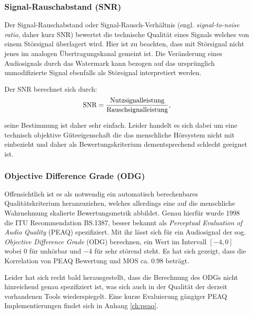 \subsubsection{Signal-Rauschabstand (SNR)} 

Der Signal-Rauschabstand oder Signal-Rausch-Verhältnis (engl. \textit{signal-to-noise ratio}, daher kurz SNR) bewertet die technische Qualität eines Signals welches von einem Störsignal überlagert wird. Hier ist zu beachten, dass mit Störsignal nicht jenes im analogen Übertragungskanal gemeint ist. Die Veränderung eines Audiosignals durch das Watermark kann bezogen auf das ursprünglich unmodifizierte Signal ebenfalls als Störsignal interpretiert werden. 

Der SNR berechnet sich durch: 
	\begin{equation}	
		\mbox{SNR} = {\mbox{Nutzsignalleistung} \over \mbox{Rauschsignalleistung}},
		\label{equ:snr}
	\end{equation}

seine Bestimmung ist daher sehr einfach. Leider handelt es sich dabei um eine technisch objektive Güteeigenschaft die das menschliche Hörsystem nicht mit einbezieht und daher als Bewertungskriterium dementsprechend schlecht geeignet ist\cite{xiang2007robust}.

\subsubsection{Objective Difference Grade (ODG)} 

Offensichtlich ist es als notwendig ein automatisch berechenbares Qualitätskriterium heranzuziehen, welches allerdings eine auf die menschliche Wahrnehmung skalierte Bewertungsmetrik abbildet. Genau hierfür wurde 1998 die ITU Recommendation BS.1387\cite{rec1998bs}, besser bekannt als \textit{Perceptual Evaluation of Audio Quality} (PEAQ) spezifiziert. Mit ihr lässt sich für ein Audiosignal der sog. \textit{Objective Difference Grade} (ODG) berechnen, ein Wert im Intervall $[-4,0]$ wobei $0$ für  \glqq{}unhörbar\grqq{} und $-4$ für \glqq{}sehr störend\grqq{} steht. Es hat sich gezeigt, dass die Korrelation von PEAQ Bewertung und MOS ca. 0.98 beträgt\cite{al2011dwt}.

Leider hat sich recht bald herausgestellt, dass die Berechnung des ODGs nicht hinreichend genau spezifiziert ist\cite{kabal2002examination}\cite{campeanu2005peaq}, was sich auch in der Qualität der derzeit vorhandenen Tools wiederspiegelt. Eine kurze Evaluierung gängiger PEAQ Implementierungen findet sich in Anhang \ref{ch:peaq}.

